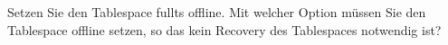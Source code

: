     \item Setzen Sie den Tablespace fullts offline. Mit welcher Option m\"ussen Sie den Tablespace offline setzen, so das kein Recovery des Tablespaces notwendig ist?

